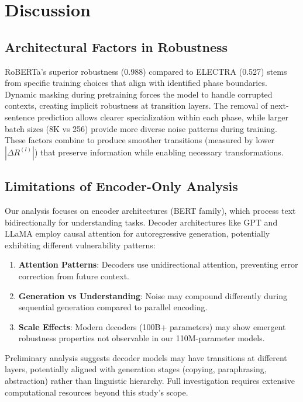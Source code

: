 \section{Discussion}
\label{sec:discussion}

\subsection{Architectural Factors in Robustness}

RoBERTa's superior robustness (0.988) compared to ELECTRA (0.527) stems from specific training choices that align with identified phase boundaries. Dynamic masking during pretraining forces the model to handle corrupted contexts, creating implicit robustness at transition layers. The removal of next-sentence prediction allows clearer specialization within each phase, while larger batch sizes (8K vs 256) provide more diverse noise patterns during training. These factors combine to produce smoother transitions (measured by lower $|\Delta R^{(l)}|$) that preserve information while enabling necessary transformations.

\subsection{Limitations of Encoder-Only Analysis}

Our analysis focuses on encoder architectures (BERT family), which process text bidirectionally for understanding tasks. Decoder architectures like GPT and LLaMA employ causal attention for autoregressive generation, potentially exhibiting different vulnerability patterns:

\begin{enumerate}
\item \textbf{Attention Patterns}: Decoders use unidirectional attention, preventing error correction from future context.
\item \textbf{Generation vs Understanding}: Noise may compound differently during sequential generation compared to parallel encoding.
\item \textbf{Scale Effects}: Modern decoders (100B+ parameters) may show emergent robustness properties not observable in our 110M-parameter models.
\end{enumerate}

Preliminary analysis suggests decoder models may have transitions at different layers, potentially aligned with generation stages (copying, paraphrasing, abstraction) rather than linguistic hierarchy. Full investigation requires extensive computational resources beyond this study's scope.

